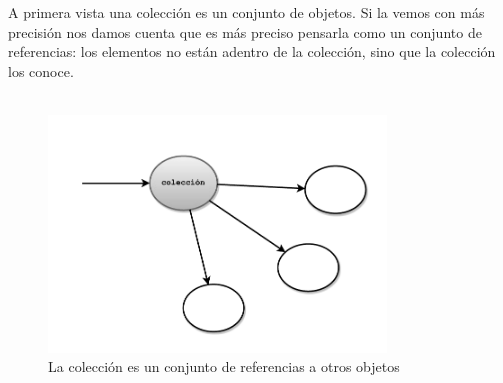 \documentclass[a4paper,12pt]{book}
\begin{document}
A primera vista una colección es un conjunto de objetos. Si la vemos con más precisión nos damos cuenta que es más
preciso pensarla como un conjunto de referencias: los elementos no están adentro de la colección, sino que la
colección los conoce. 
\\
\\
\begin{figure}
    \centering
    \includegraphics[width=0.8\textwidth]{images/01_GraficoInicial_Colecciones.pdf}
    \caption{La colección es un conjunto de referencias a otros objetos}
\end{figure}
\\
\end{document}
